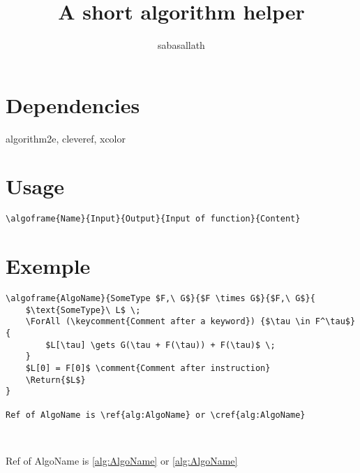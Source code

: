 \documentclass{article}
\title{A short algorithm helper}
\author{sabasallath}
\begin{document}
\maketitle

\section{Dependencies}
algorithm2e, cleveref, xcolor
\section{Usage}

\begin{lstlisting}[basicstyle=\sffamily]
\algoframe{Name}{Input}{Output}{Input of function}{Content}
\end{lstlisting}

\section{Exemple}

\begin{lstlisting}[basicstyle=\sffamily]
\algoframe{AlgoName}{SomeType $F,\ G$}{$F \times G$}{$F,\ G$}{
    $\text{SomeType}\ L$ \;
    \ForAll (\keycomment{Comment after a keyword}) {$\tau \in F^\tau$} {
        $L[\tau] \gets G(\tau + F(\tau)) + F(\tau)$ \;
    }
    $L[0] = F[0]$ \comment{Comment after instruction}
    \Return{$L$}
}

Ref of AlgoName is \ref{alg:AlgoName} or \cref{alg:AlgoName}
\end{lstlisting}

~


Ref of AlgoName is \ref{alg:AlgoName} or \cref{alg:AlgoName}
\end{document}
